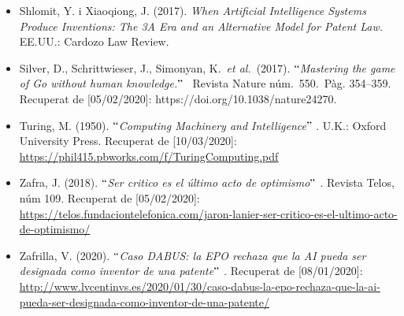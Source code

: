 \documentclass[12pt]{article}
\begin{document}
\begin{itemize}
\vspace{\baselineskip}
	\item Shlomit, Y. i Xiaoqiong, J. (2017). \textit{ When Artificial Intelligence Systems Produce Inventions: The 3A Era and an Alternative Model for Patent Law.} EE.UU.:\textit{ }Cardozo Law Review. \par


\vspace{\baselineskip}
	\item \textcolor[HTML]{222222}{Silver, D., Schrittwieser, J., Simonyan, K. \textit{et al.} (2017). $``$\textit{Mastering the game of Go without human knowledge.}$"$  Revista Nature núm. 550. Pàg. 354–359. Recuperat de [05/02/2020]: \href{https://doi.org/10.1038/nature24270}{}https://doi.org/10.1038/nature24270}\textcolor[HTML]{222222}{. }\par


\vspace{\baselineskip}
	\item Turing, M. (1950). \textit{$``$Computing Machinery and Intelligence$"$ }. U.K.: Oxford University Press. Recuperat de [10/03/2020]: \href{https://phil415.pbworks.com/f/TuringComputing.pdf}{\textcolor[HTML]{0000FF}{\ul{https://phil415.pbworks.com/f/TuringComputing.pdf}}}\par


\vspace{\baselineskip}
	\item Zafra, J. (2018). \textit{$``$Ser critico es el último acto de optimismo$"$ . }Revista Telos, núm 109. Recuperat de [05/02/2020]: \href{https://telos.fundaciontelefonica.com/jaron-lanier-ser-critico-es-el-ultimo-acto-de-optimismo/}{https://telos.fundaciontelefonica.com/jaron-lanier-ser-critico-es-el-ultimo-acto-de-optimismo/}\par


\vspace{\baselineskip}
	\item Zafrilla, V. (2020). $``$\textit{Caso DABUS: la EPO rechaza que la AI pueda ser designada como inventor de una patente$"$ .} Recuperat de [08/01/2020]: \href{http://www.lvcentinvs.es/2020/01/30/caso-dabus-la-epo-rechaza-que-la-ai-pueda-ser-designada-como-inventor-de-una-patente/}{http://www.lvcentinvs.es/2020/01/30/caso-dabus-la-epo-rechaza-que-la-ai-pueda-ser-designada-como-inventor-de-una-patente/}
\end{itemize}\par


\vspace{\baselineskip}
\end{document}
